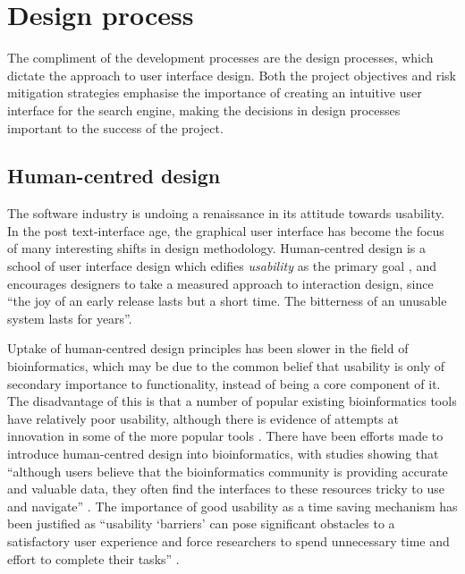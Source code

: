 \newpage
\section{Design process}\label{sec:design-process}

The compliment of the development processes are the design processes,
which dictate the approach to user interface design. Both the project
objectives and risk mitigation strategies emphasise the importance of
creating an intuitive user interface for the search engine, making the
decisions in design processes important to the success of the project.

\subsection{Human-centred design}\label{subsec:user-centred-design}

The software industry is undoing a renaissance in its attitude towards
usability. In the post text-interface age, the graphical user
interface has become the focus of many interesting shifts in design
methodology. Human-centred design is a school of user interface design
which edifies \textit{usability} as the primary goal
\cite{maguire2001methods}, and encourages designers to take a measured
approach to interaction design, since ``the joy of an early release
lasts but a short time. The bitterness of an unusable system lasts for
years''.

Uptake of human-centred design principles has been slower in the field
of bioinformatics, which may be due to the common belief that
usability is only of secondary importance to functionality, instead of
being a core component of it. The disadvantage of this is that a
number of popular existing bioinformatics tools have relatively poor
usability, although there is evidence of attempts at innovation in
some of the more popular tools \cite{lu2011pubmed,
  hearst2007biotext}. There have been efforts made to introduce
human-centred design into bioinformatics, with studies showing that
``although users believe that the bioinformatics community is
providing accurate and valuable data, they often find the interfaces
to these resources tricky to use and navigate''
\cite{pavelin2012bioinformatics}. The importance of good usability as
a time saving mechanism has been justified as ``usability `barriers'
can pose significant obstacles to a satisfactory user experience and
force researchers to spend unnecessary time and effort to complete
their tasks'' \cite{bolchini2009better}.

